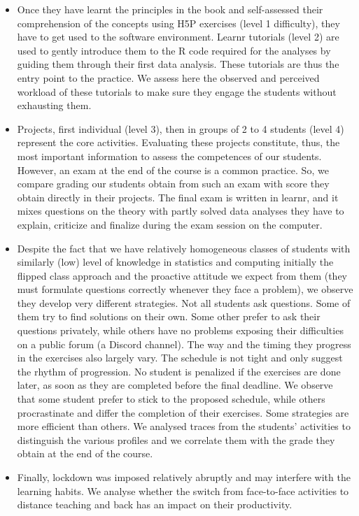 \documentclass{aims}
\theoremstyle{definition}
\begin{document}
\begin{itemize}
\item
  Once they have learnt the principles in the book and self-assessed
  their comprehension of the concepts using H5P exercises (level 1
  difficulty), they have to get used to the software environment. Learnr
  tutorials (level 2) are used to gently introduce them to the R code
  required for the analyses by guiding them through their first data
  analysis. These tutorials are thus the entry point to the practice. We
  assess here the observed and perceived workload of these tutorials to
  make sure they engage the students without exhausting them.
\item
  Projects, first individual (level 3), then in groups of 2 to 4
  students (level 4) represent the core activities. Evaluating these
  projects constitute, thus, the most important information to assess
  the competences of our students. However, an exam at the end of the
  course is a common practice. So, we compare grading our students
  obtain from such an exam with score they obtain directly in their
  projects. The final exam is written in learnr, and it mixes questions
  on the theory with partly solved data analyses they have to explain,
  criticize and finalize during the exam session on the computer.
\item
  Despite the fact that we have relatively homogeneous classes of
  students with similarly (low) level of knowledge in statistics and
  computing initially the flipped class approach and the proactive
  attitude we expect from them (they must formulate questions correctly
  whenever they face a problem), we observe they develop very different
  strategies. Not all students ask questions. Some of them try to find
  solutions on their own. Some other prefer to ask their questions
  privately, while others have no problems exposing their difficulties
  on a public forum (a Discord channel). The way and the timing they
  progress in the exercises also largely vary. The schedule is not tight
  and only suggest the rhythm of progression. No student is penalized if
  the exercises are done later, as soon as they are completed before the
  final deadline. We observe that some student prefer to stick to the
  proposed schedule, while others procrastinate and differ the
  completion of their exercises. Some strategies are more efficient than
  others. We analysed traces from the students' activities to
  distinguish the various profiles and we correlate them with the grade
  they obtain at the end of the course.
\item
  Finally, lockdown was imposed relatively abruptly and may interfere
  with the learning habits. We analyse whether the switch from
  face-to-face activities to distance teaching and back has an impact on
  their productivity.
\end{itemize}
\end{document}
